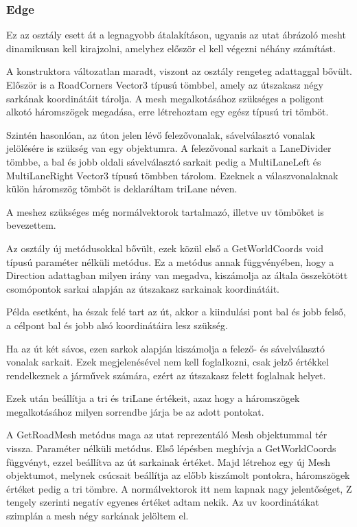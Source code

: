 \subsubsection{Edge}
Ez az osztály esett át a legnagyobb átalakításon, ugyanis az utat ábrázoló mesht dinamikusan kell kirajzolni, amelyhez először el kell végezni néhány számítást.

A konstruktora változatlan maradt, viszont az osztály rengeteg adattaggal bővült. Először is a RoadCorners Vector3 típusú tömbbel, amely az útszakasz négy sarkának koordinátáit tárolja. A mesh megalkotásához szükséges a poligont alkotó háromszögek megadása, erre létrehoztam egy egész típusú tri tömböt.

Szintén hasonlóan, az úton jelen lévő felezővonalak, sávelválasztó vonalak jelölésére is szükség van egy objektumra. A felezővonal sarkait a LaneDivider tömbbe, a bal és jobb oldali sávelválasztó sarkait pedig a MultiLaneLeft és MultiLaneRight Vector3 típusú tömbben tárolom. Ezeknek a válaszvonalaknak külön háromszög tömböt is deklaráltam triLane néven.

A meshez szükséges még normálvektorok tartalmazó, illetve uv tömböket is bevezettem.

Az osztály új metódusokkal bővült, ezek közül első a GetWorldCoords void típusú paraméter nélküli metódus. Ez a metódus annak függvényében, hogy a Direction adattagban milyen irány van megadva, kiszámolja az általa összekötött csomópontok sarkai alapján az útszakasz sarkainak koordinátáit.

Példa esetként, ha észak felé tart az út, akkor a kiindulási pont bal és jobb felső, a célpont bal és jobb alsó koordinátáira lesz szükség.

Ha az út két sávos, ezen sarkok alapján kiszámolja a felező- és sávelválasztó vonalak sarkait. Ezek megjelenésével nem kell foglalkozni, csak jelző értékkel rendelkeznek a járművek számára, ezért az útszakasz felett foglalnak helyet.

Ezek után beállítja a tri és triLane értékeit, azaz hogy a háromszögek megalkotásához milyen sorrendbe járja be az adott pontokat.


A GetRoadMesh metódus maga az utat reprezentáló Mesh objektummal tér vissza. Paraméter nélküli metódus. Első lépésben meghívja a GetWorldCoords függvényt, ezzel beállítva az út sarkainak értéket. Majd létrehoz egy új Mesh objektumot, melynek csúcsait beállítja az előbb kiszámolt pontokra, háromszögek értéket pedig a tri tömbre. A normálvektorok itt nem kapnak nagy jelentőséget, Z tengely szerinti negatív egyenes értéket adtam nekik. Az uv koordinátákat szimplán a mesh négy sarkának jelöltem el.

